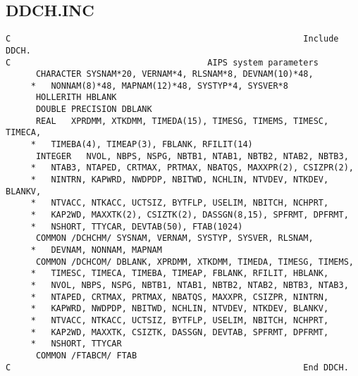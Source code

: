 \subsection{DDCH.INC}
\begin{verbatim}
C                                                          Include DDCH.
C                                       AIPS system parameters
      CHARACTER SYSNAM*20, VERNAM*4, RLSNAM*8, DEVNAM(10)*48,
     *   NONNAM(8)*48, MAPNAM(12)*48, SYSTYP*4, SYSVER*8
      HOLLERITH HBLANK
      DOUBLE PRECISION DBLANK
      REAL   XPRDMM, XTKDMM, TIMEDA(15), TIMESG, TIMEMS, TIMESC, TIMECA,
     *   TIMEBA(4), TIMEAP(3), FBLANK, RFILIT(14)
      INTEGER   NVOL, NBPS, NSPG, NBTB1, NTAB1, NBTB2, NTAB2, NBTB3,
     *   NTAB3, NTAPED, CRTMAX, PRTMAX, NBATQS, MAXXPR(2), CSIZPR(2),
     *   NINTRN, KAPWRD, NWDPDP, NBITWD, NCHLIN, NTVDEV, NTKDEV, BLANKV,
     *   NTVACC, NTKACC, UCTSIZ, BYTFLP, USELIM, NBITCH, NCHPRT,
     *   KAP2WD, MAXXTK(2), CSIZTK(2), DASSGN(8,15), SPFRMT, DPFRMT,
     *   NSHORT, TTYCAR, DEVTAB(50), FTAB(1024)
      COMMON /DCHCHM/ SYSNAM, VERNAM, SYSTYP, SYSVER, RLSNAM,
     *   DEVNAM, NONNAM, MAPNAM
      COMMON /DCHCOM/ DBLANK, XPRDMM, XTKDMM, TIMEDA, TIMESG, TIMEMS,
     *   TIMESC, TIMECA, TIMEBA, TIMEAP, FBLANK, RFILIT, HBLANK,
     *   NVOL, NBPS, NSPG, NBTB1, NTAB1, NBTB2, NTAB2, NBTB3, NTAB3,
     *   NTAPED, CRTMAX, PRTMAX, NBATQS, MAXXPR, CSIZPR, NINTRN,
     *   KAPWRD, NWDPDP, NBITWD, NCHLIN, NTVDEV, NTKDEV, BLANKV,
     *   NTVACC, NTKACC, UCTSIZ, BYTFLP, USELIM, NBITCH, NCHPRT,
     *   KAP2WD, MAXXTK, CSIZTK, DASSGN, DEVTAB, SPFRMT, DPFRMT,
     *   NSHORT, TTYCAR
      COMMON /FTABCM/ FTAB
C                                                          End DDCH.
\end{verbatim}

